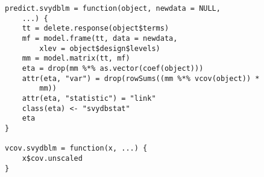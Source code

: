 \begin{lstlisting}
predict.svydblm = function(object, newdata = NULL, 
    ...) {
    tt = delete.response(object$terms)
    mf = model.frame(tt, data = newdata, 
        xlev = object$design$levels)
    mm = model.matrix(tt, mf)
    eta = drop(mm %*% as.vector(coef(object)))
    attr(eta, "var") = drop(rowSums((mm %*% vcov(object)) * 
        mm))
    attr(eta, "statistic") = "link"
    class(eta) <- "svydbstat"
    eta
}

vcov.svydblm = function(x, ...) {
    x$cov.unscaled
}
\end{lstlisting}